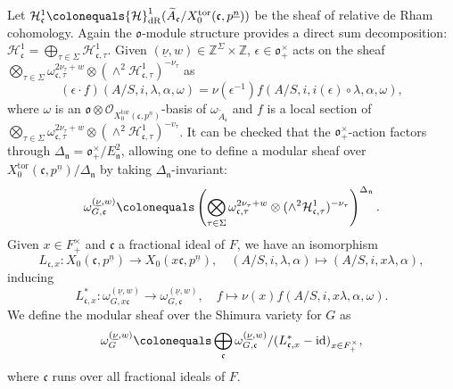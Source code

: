 \documentclass[11pt]{amsart}
\theoremstyle{definition} %
\theoremstyle{plain} %
\theoremstyle{remark} %
\newcommand{\ZZ}{{\mathbb Z}}
\newcommand{\cH}{{\mathcal H}}
\newcommand{\cO}{{\mathcal O}}
\newcommand{\frakc}{\mathfrak c}
\newcommand{\frakn}{\mathfrak n}
\newcommand{\frako}{\mathfrak o}
\newcommand{\dR}{\mathrm{dR}}
\newcommand{\defeq}{\colonequals} %
\newcommand{\tor}{\mathrm{tor}} %
\newcommand{\id}{\mathrm{id}} %
\begin{document}
Let $\cH^1_\frakc\defeq \cH^1_\dR(\widetilde{A}_\frakc/X_0^\tor(\frakc,p^{\underline{n}}))$ be the sheaf of relative de Rham cohomology.
Again the $\frako$-module structure provides a direct sum decomposition: $\cH^1_\frakc = \bigoplus_{\tau\in\Sigma} \cH^1_{\frakc,\tau}$.
Given $(\underline{\nu}, w)\in \ZZ^\Sigma\times \ZZ$, $\epsilon\in\frako_+^\times$ acts on the sheaf $\bigotimes_{\tau\in\Sigma} \omega_{\frakc,\tau}^{2\nu_\tau+w}\otimes (\wedge^2\cH^1_{\frakc,\tau})^{-\nu_\tau}$ as  
\[
(\epsilon\cdot f)(A/S,i,\lambda,\alpha,\omega) = \nu(\epsilon^{-1})f(A/S,i,i(\epsilon)\circ\lambda,\alpha,\omega),
\]
where $\omega$  is  an $\frako\otimes\cO_{X_0^\tor(\frakc,p^{\underline{n}})}$-basis of $\omega_{\widetilde{A}_\frakc}$ and $f$  is a local section of $\bigotimes_{\tau\in\Sigma} \omega_{\frakc,\tau}^{2\nu_\tau+w}\otimes (\wedge^2\cH^1_{\frakc,\tau})^{-v_\tau}$.  
It can  be checked that the $\frako_+^\times$-action factors through $\Delta_\frakn = \frako_+^\times/E_\frakn^2$, allowing one to define a modular sheaf over $X_0^\tor(\frakc,p^{\underline{n}})/\Delta_\frakn$ by taking  $\Delta_\frakn$-invariant:
\[
\omega_{G,\frakc}^{(\underline{\nu},w)} \defeq \left(\bigotimes_{\tau\in\Sigma} \omega_{\frakc,\tau}^{2\nu_\tau+w}\otimes (\wedge^2\cH^1_{\frakc,\tau})^{-\nu_\tau}\right)^{\Delta_\frakn}.
\]
Given $x\in F_+^\times$ and $\frakc$ a fractional ideal of $F$, we have an isomorphism
\[
L_{\frakc,x}\colon
X_0(\frakc,p^{\underline{n}}) \rightarrow X_0(x\frakc,p^{\underline{n}}) , \quad (A/S, i,\lambda,\alpha) \mapsto (A/S, i, x\lambda,\alpha), \]
inducing
\[
L_{\frakc,x}^\ast\colon
\omega_{G,x\frakc}^{(\underline{\nu},w)} \rightarrow \omega_{G,\frakc}^{(\underline{\nu},w)}, \quad f \mapsto \nu(x)f(A/S,i,x\lambda,\alpha,\omega).
\]
We define the modular sheaf over the Shimura variety for $G$ as
\[
\omega_G^{(\underline{\nu},w)} \defeq \bigoplus_{\frakc} \omega_{G,\frakc}^{(\underline{\nu}, w)}/ (L_{\frakc,x}^\ast-\id)_{x\in F^\times_+},
\]
where $\frakc$ runs over all fractional ideals of $F$.
\end{document}
